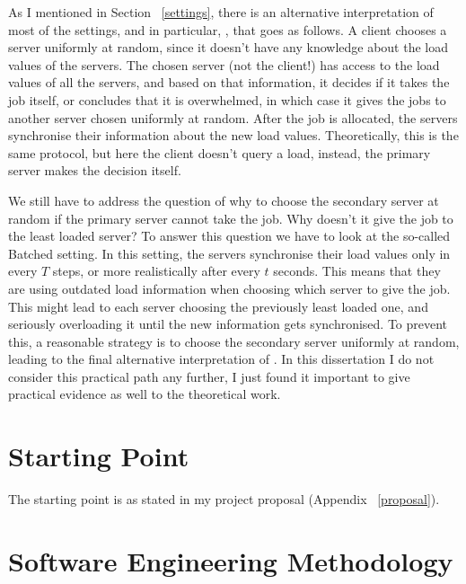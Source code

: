 As I mentioned in Section ~\ref{settings}, there is an alternative interpretation of most of the settings, and in particular, \TwoThinning, that goes as follows. A client chooses a server uniformly at random, since it doesn't have any knowledge about the load values of the servers. The chosen server (not the client!) has access to the load values of all the servers, and based on that information, it decides if it takes the job itself, or concludes that it is overwhelmed, in which case it gives the jobs to another server chosen uniformly at random. After the job is allocated, the servers synchronise their information about the new load values. Theoretically, this is the same \TwoThinning protocol, but here the client doesn't query a load, instead, the primary server makes the decision itself.


We still have to address the question of why to choose the secondary server at random if the primary server cannot take the job. Why doesn't it give the job to the least loaded server? To answer this question we have to look at the so-called Batched setting. In this setting, the servers synchronise their load values only in every $T$ steps, or more realistically after every $t$ seconds. This means that they are using outdated load information when choosing which server to give the job. This might lead to each server choosing the previously least loaded one, and seriously overloading it until the new information gets synchronised. To prevent this, a reasonable strategy is to choose the secondary server uniformly at random, leading to the final alternative interpretation of \TwoThinning. In this dissertation I do not consider this practical path any further, I just found it important to give practical evidence as well to the theoretical work.
\fi


\section{Starting Point}

The starting point is as stated in my project proposal (Appendix ~\ref{proposal}). 


\section{Software Engineering Methodology}





